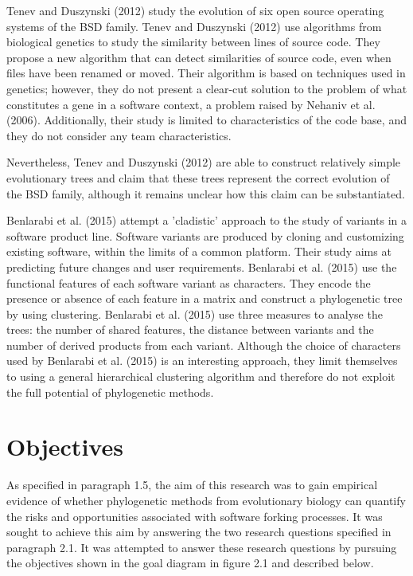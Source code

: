 Tenev and Duszynski (2012) study the evolution of six open source operating systems of the BSD family. Tenev and Duszynski (2012) use algorithms from biological genetics to study the similarity between lines of source code. They propose a new algorithm that can detect similarities of source code, even when files have been renamed or moved. Their algorithm is based on techniques used in genetics; however, they do not present a clear-cut solution to the problem of what constitutes a gene in a software context, a problem raised by Nehaniv et al. (2006). Additionally, their study is limited to characteristics of the code base, and they do not consider any team characteristics.

Nevertheless, Tenev and Duszynski (2012) are able to construct relatively simple evolutionary trees and claim that these trees represent the correct evolution of the BSD family, although it remains unclear how this claim can be substantiated.

Benlarabi et al. (2015) attempt a 'cladistic' approach to the study of variants in a software product line. Software variants are produced by cloning and customizing existing software, within the limits of a common platform. Their study aims at predicting future changes and user requirements. Benlarabi et al. (2015) use the functional features of each software variant as characters. They encode the presence or absence of each feature in a matrix and construct a phylogenetic tree by using clustering. Benlarabi et al. (2015) use three measures to analyse the trees: the number of shared features, the distance between variants and the number of derived products from each variant. Although the choice of characters used by Benlarabi et al. (2015) is an interesting approach, they limit themselves to using a general hierarchical clustering algorithm and therefore do not exploit the full potential of phylogenetic methods.


\section{Objectives}

As specified in paragraph 1.5, the aim of this research was to gain empirical evidence of whether phylogenetic methods from evolutionary biology can quantify the risks and opportunities associated with software forking processes. It was sought to achieve this aim by answering the two research questions specified in paragraph 2.1. It was attempted to answer these research questions by pursuing the objectives shown in the goal diagram in figure 2.1 and described below.

